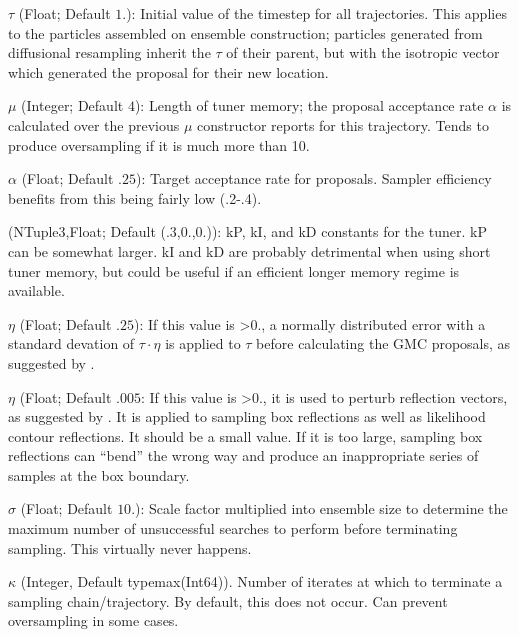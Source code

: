 $\tau$ (Float; Default $1.$): Initial value of the timestep for all trajectories. This applies to the particles assembled on ensemble construction; particles generated from diffusional resampling inherit the $\tau$ of their parent, but with the isotropic vector which generated the proposal for their new location.

$\mu$ (Integer; Default $4$): Length of tuner memory; the proposal acceptance rate $\alpha$ is calculated over the previous $\mu$ constructor reports for this trajectory. Tends to produce oversampling if it is much more than 10.

$\alpha$ (Float; Default $.25$): Target acceptance rate for proposals. Sampler efficiency benefits from this being fairly low (.2-.4).

 (NTuple{3,Float}; Default ($.3$,$0.$,$0.$)): kP, kI, and kD constants for the tuner. kP can be somewhat larger. kI and kD are probably detrimental when using short tuner memory, but could be useful if an efficient longer memory regime is available.

$\eta$ (Float; Default $.25$): If this value is >0., a normally distributed error with a standard devation of $\tau \cdot $$\eta$ is applied to $\tau$ before calculating the GMC proposals, as suggested by \cite{Skilling2012}.

$\eta$ (Float; Default $.005$: If this value is >0., it is used to perturb reflection vectors, as suggested by \cite{Skilling2012}. It is applied to sampling box reflections as well as likelihood contour reflections. It should be a small value. If it is too large, sampling box reflections can ``bend'' the wrong way and produce an inappropriate series of samples at the box boundary.

$\sigma$ (Float; Default $10.$): Scale factor multiplied into ensemble size to determine the maximum number of unsuccessful searches to perform before terminating sampling. This virtually never happens.

$\kappa$ (Integer, Default typemax(Int64)). Number of iterates at which to terminate a sampling chain/trajectory. By default, this does not occur. Can prevent oversampling in some cases.



